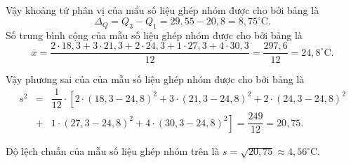 \begin{ex}
{\begin{listEX}
$$			$$
			Vậy khoảng tứ phân vị của mẩu số liệu ghép nhóm được cho bởi bảng là
			$$\Delta_{Q}=Q_{3}-Q_{1}=29{,}55-20{,}8=8{,}75^{\circ} \mathrm{C}.$$
			Số trung bình cộng của mẫu số liệu ghép nhóm được cho bởi bảng là
			$$\overline{x}=\dfrac{2 \cdot 18{,}3+3 \cdot 21{,}3+2 \cdot 24{,}3+1 \cdot 27{,}3+4 \cdot 30{,}3}{12}=\dfrac{297{,}6}{12}=24{,}8^{\circ} \mathrm{C}.$$
			\item Vậy phương sai của của mẫu số liệu ghép nhóm được cho bởi bảng là
			\begin{eqnarray*}
				s^{2}&=&\dfrac{1}{12} \cdot\left[2 \cdot(18{,}3-24{,}8)^{2}+3 \cdot(21{,}3-24{,}8)^{2}+2 \cdot(24{,}3-24{,}8)^{2}\right.\\
				&+&\left.1 \cdot(27{,}3-24{,}8)^{2}+4 \cdot(30{,}3-24{,}8)^{2}\right]=\dfrac{249}{12}=20{,}75.
			\end{eqnarray*}			
			\item 	Độ lệch chuấn của mẫu số liệu ghép nhóm trên là $s=\sqrt{20{,}75} \approx 4{,}56^{\circ} \mathrm{C}$.
		\end{listEX}	
	} 
\end{ex}

